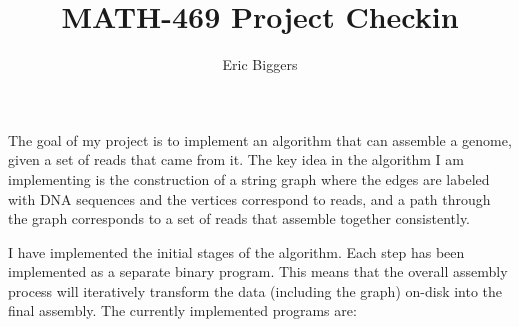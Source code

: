 \documentclass[letterpaper,12pt]{article}
\title{MATH-469 Project Checkin}
\author{Eric Biggers}
\begin{document}
\maketitle

The goal of my project is to implement an algorithm that can assemble a genome,
given a set of reads that came from it.  The key idea in the algorithm I am
implementing is the construction of a string graph where the edges are labeled
with DNA sequences and the vertices correspond to reads, and a path through the
graph corresponds to a set of reads that assemble together consistently.

I have implemented the initial stages of the algorithm.  Each step has been
implemented as a separate binary program.  This means that the overall assembly
process will iteratively transform the data (including the graph) on-disk into
the final assembly.  The currently implemented programs are:
\end{document}
